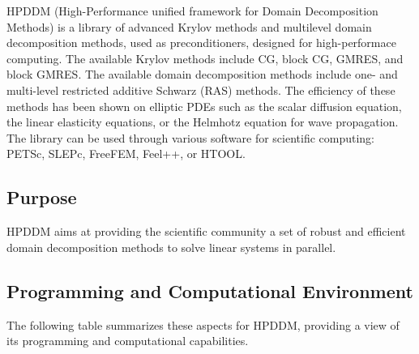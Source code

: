 HPDDM (High-Performance unified framework for Domain Decomposition Methods) is a library of
advanced Krylov methods and multilevel domain decomposition methods, used as preconditioners, designed for high-performace computing.
The available Krylov methods include CG, block CG, GMRES, and block GMRES.
The available domain decomposition methods include one- and multi-level restricted additive Schwarz (RAS) methods.
The efficiency of these methods has been shown on elliptic PDEs such as the scalar diffusion equation, the linear elasticity equations,
or the Helmhotz equation for wave propagation.
The library can be used through various software for scientific computing:
PETSc, SLEPc, FreeFEM, Feel++, or HTOOL.

\subsection{Purpose}
\label{sec:HPDDM:purpose}

HPDDM aims at providing the scientific community a set of robust and efficient domain decomposition methods
to solve linear systems in parallel.

\subsection{Programming and Computational Environment}
\label{sec::HPDDM:environment_capabilities}


The following table summarizes these aspects for HPDDM, providing a  view of its programming and computational capabilities.

